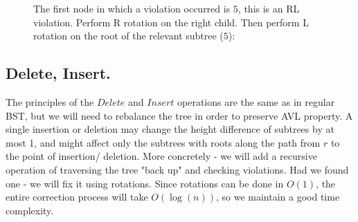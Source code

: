 \begin{figure}[h]
  \centering
  \begin{subfigure}[b]{0.31\textwidth}
  \end{subfigure}
\begin{subfigure}[b]{0.31\textwidth}
  \end{subfigure}
\begin{subfigure}[b]{0.31\textwidth}

\end{subfigure}
  \caption{ 
The first node in which a violation occurred is $5$, this is an RL violation.
Perform R rotation on the right child. Then perform L rotation on the root of the relevant subtree ($5$):
}
\end{figure}
\subsection{Delete, Insert.}
The principles of the $Delete$ and $Insert$ operations are the same as in
regular BST, but we will need to rebalance the tree in order to preserve AVL
property.
A single insertion or deletion may change the height difference of subtrees
by at most 1, and might affect only the subtrees with roots along the path
from $r$ to the point of insertion/ deletion.
More concretely - we will add a recursive operation of traversing the tree
"back up" and checking violations. Had we found one - we will fix it using
rotations. Since rotations can be done in $O(1)$, the entire correction
process will take $O(\log(n))$, so we maintain a good time complexity.



